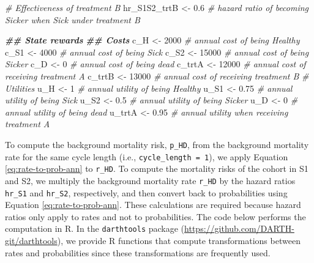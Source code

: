 \documentclass[
]{article}
\newenvironment{Shaded}{\begin{snugshade}}{\end{snugshade}}
\newcommand{\CommentTok}[1]{\textcolor[rgb]{0.56,0.35,0.01}{\textit{#1}}}
\newcommand{\DecValTok}[1]{\textcolor[rgb]{0.00,0.00,0.81}{#1}}
\newcommand{\DocumentationTok}[1]{\textcolor[rgb]{0.56,0.35,0.01}{\textbf{\textit{#1}}}}
\newcommand{\FloatTok}[1]{\textcolor[rgb]{0.00,0.00,0.81}{#1}}
\newcommand{\NormalTok}[1]{#1}
\newcommand{\OtherTok}[1]{\textcolor[rgb]{0.56,0.35,0.01}{#1}}
\begin{document}
\begin{Shaded}
\begin{Highlighting}[]
\CommentTok{\# Effectiveness of treatment B}
\NormalTok{hr\_S1S2\_trtB }\OtherTok{\textless{}{-}} \FloatTok{0.6} \CommentTok{\# hazard ratio of becoming Sicker when Sick under treatment B}

\DocumentationTok{\#\# State rewards}
\DocumentationTok{\#\# Costs}
\NormalTok{c\_H    }\OtherTok{\textless{}{-}} \DecValTok{2000}  \CommentTok{\# annual cost of being Healthy}
\NormalTok{c\_S1   }\OtherTok{\textless{}{-}} \DecValTok{4000}  \CommentTok{\# annual cost of being Sick}
\NormalTok{c\_S2   }\OtherTok{\textless{}{-}} \DecValTok{15000} \CommentTok{\# annual cost of being Sicker}
\NormalTok{c\_D    }\OtherTok{\textless{}{-}} \DecValTok{0}     \CommentTok{\# annual cost of being dead}
\NormalTok{c\_trtA }\OtherTok{\textless{}{-}} \DecValTok{12000} \CommentTok{\# annual cost of receiving treatment A}
\NormalTok{c\_trtB }\OtherTok{\textless{}{-}} \DecValTok{13000} \CommentTok{\# annual cost of receiving treatment B}
\CommentTok{\# Utilities}
\NormalTok{u\_H    }\OtherTok{\textless{}{-}} \DecValTok{1}     \CommentTok{\# annual utility of being Healthy}
\NormalTok{u\_S1   }\OtherTok{\textless{}{-}} \FloatTok{0.75}  \CommentTok{\# annual utility of being Sick}
\NormalTok{u\_S2   }\OtherTok{\textless{}{-}} \FloatTok{0.5}   \CommentTok{\# annual utility of being Sicker}
\NormalTok{u\_D    }\OtherTok{\textless{}{-}} \DecValTok{0}     \CommentTok{\# annual utility of being dead}
\NormalTok{u\_trtA }\OtherTok{\textless{}{-}} \FloatTok{0.95}  \CommentTok{\# annual utility when receiving treatment A}
\end{Highlighting}
\end{Shaded}

To compute the background mortality risk, \texttt{p\_HD}, from the background mortality rate for the same cycle length (i.e., \texttt{cycle\_length\ =\ 1}), we apply Equation \eqref{eq:rate-to-prob-ann} to \texttt{r\_HD}. To compute the mortality risks of the cohort in S1 and S2, we multiply the background mortality rate \texttt{r\_HD} by the hazard ratios \texttt{hr\_S1} and \texttt{hr\_S2}, respectively, and then convert back to probabilities using Equation \eqref{eq:rate-to-prob-ann}. These calculations are required because hazard ratios only apply to rates and not to probabilities. The code below performs the computation in R. In the \texttt{darthtools} package (\url{https://github.com/DARTH-git/darthtools}), we provide R functions that compute transformations between rates and probabilities since these transformations are frequently used.
\end{document}
